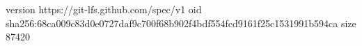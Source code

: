 version https://git-lfs.github.com/spec/v1
oid sha256:68ca009c83d0e0727daf9c700f68b902f4bdf554fcd9161f25c1531991b594ca
size 87420
